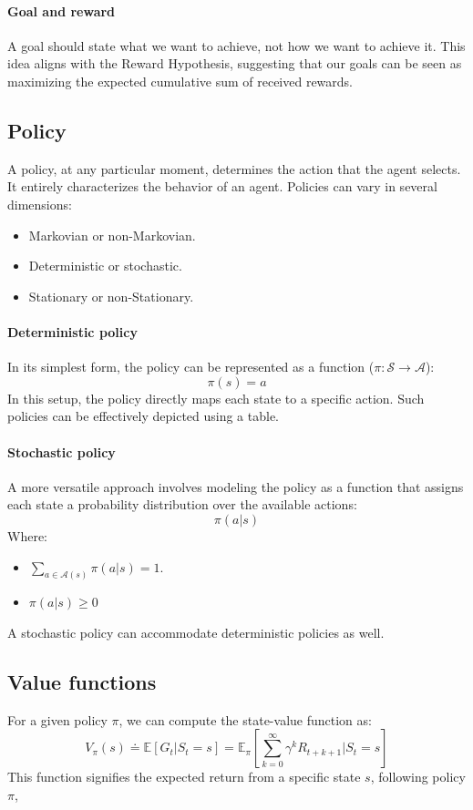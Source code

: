 \paragraph*{Goal and reward}
A goal should state what we want to achieve, not how we want to achieve it.
This idea aligns with the Reward Hypothesis, suggesting that our goals can be seen as maximizing the expected cumulative sum of received rewards.

\subsection{Policy}
A policy, at any particular moment, determines the action that the agent selects.
It entirely characterizes the behavior of an agent. 
Policies can vary in several dimensions:
\begin{itemize}
    \item Markovian or non-Markovian.
    \item Deterministic or stochastic.
    \item Stationary or non-Stationary.
\end{itemize}

\paragraph*{Deterministic policy}
In its simplest form, the policy can be represented as a function ($\pi: \mathcal{S} \rightarrow \mathcal{A}$):
\[\pi(s)=a\]
In this setup, the policy directly maps each state to a specific action. 
Such policies can be effectively depicted using a table.

\paragraph*{Stochastic policy}
A more versatile approach involves modeling the policy as a function that assigns each state a probability distribution over the available actions:
\[\pi(a|s)\]
Where:
\begin{itemize}
    \item $\sum_{a\in\mathcal{A}(s)}\pi(a|s)=1$.
    \item $\pi(a|s)\geq 0$
\end{itemize}
A stochastic policy can accommodate deterministic policies as well.

\subsection{Value functions}
For a given policy $\pi$, we can compute the state-value function as:
\[V_{\pi}(s) \doteq \mathbb{E}\left[G_t|S_t=s\right]=\mathbb{E}_{\pi}\left[\sum_{k=0}^{\infty}\gamma^kR_{t+k+1}|S_t=s\right]\]
This function signifies the expected return from a specific state $s$, following policy $\pi$, 

